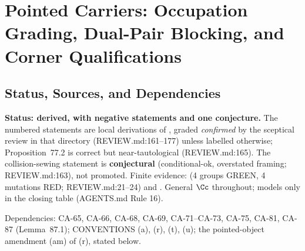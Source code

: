 
\section{Pointed Carriers: Occupation Grading, Dual-Pair Blocking, and Corner Qualifications}
\label{sec:pointed-carrier-invariants}

\subsection{Status, Sources, and Dependencies}

\textbf{Status: derived, with negative statements and one conjecture.}  The
numbered statements are local derivations of
, graded
\emph{confirmed} by the sceptical review  in that directory
(REVIEW.md:161--177) unless labelled otherwise; Proposition~77.2 is correct but
near-tautological (REVIEW.md:165).  The collision-sewing statement is
\textbf{conjectural} (conditional-ok, overstated framing; REVIEW.md:163), not
promoted.  Finite evidence:  (4 groups GREEN, 4
mutations RED; REVIEW.md:21--24) and .  General
\(\Cc\) throughout; models only in the closing table (AGENTS.md Rule 16).

Dependencies: CA-65, CA-66, CA-68, CA-69, CA-71--CA-73, CA-75, CA-81, CA-87
(Lemma~87.1); CONVENTIONS (a), (r), (t), (u); the pointed-object amendment (am)
of (r), stated below.

